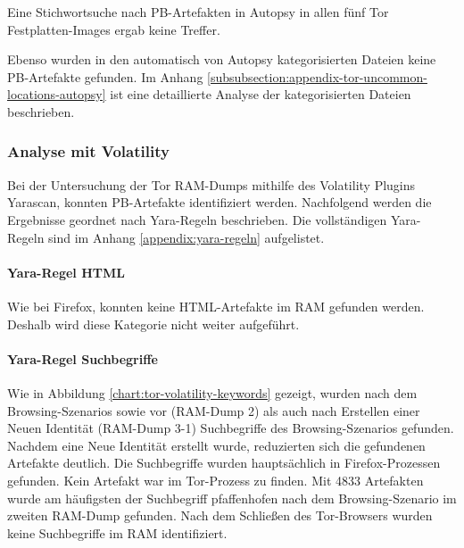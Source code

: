 Eine Stichwortsuche nach PB-Artefakten in Autopsy in allen fünf Tor Festplatten-Images ergab keine Treffer.

Ebenso wurden in den automatisch von Autopsy kategorisierten Dateien keine PB-Artefakte gefunden. 
Im Anhang \ref{subsubsection:appendix-tor-uncommon-locations-autopsy} ist eine detaillierte Analyse der kategorisierten Dateien beschrieben.


\subsubsection*{Analyse mit Volatility}
Bei der Untersuchung der Tor RAM-Dumps mithilfe des Volatility Plugins Yarascan, konnten PB-Artefakte identifiziert werden.
Nachfolgend werden die Ergebnisse geordnet nach Yara-Regeln beschrieben. Die vollständigen Yara-Regeln sind im Anhang \ref{appendix:yara-regeln} aufgelistet.

\paragraph*{Yara-Regel \glqq{}HTML\grqq{}}
Wie bei Firefox, konnten keine HTML-Artefakte im RAM gefunden werden. Deshalb wird diese Kategorie nicht weiter aufgeführt.

\paragraph*{Yara-Regel \glqq{}Suchbegriffe\grqq{}}
Wie in Abbildung \ref{chart:tor-volatility-keywords} gezeigt, wurden nach dem Browsing-Szenarios sowie vor (RAM-Dump 2) als auch nach Erstellen einer \glqq{}Neuen Identität\grqq{} (RAM-Dump 3-1) Suchbegriffe des Browsing-Szenarios gefunden.
Nachdem eine \glqq{}Neue Identität\grqq{} erstellt wurde, reduzierten sich die gefundenen Artefakte deutlich. 
Die Suchbegriffe wurden hauptsächlich in Firefox-Prozessen gefunden. Kein Artefakt war im Tor-Prozess zu finden.
Mit 4833 Artefakten wurde am häufigsten der Suchbegriff \glqq{}pfaffenhofen\grqq{} nach dem Browsing-Szenario im zweiten RAM-Dump gefunden. 
Nach dem Schließen des Tor-Browsers wurden keine Suchbegriffe im RAM identifiziert.

